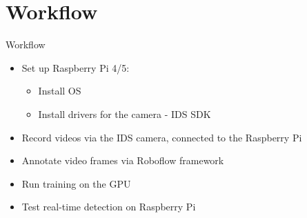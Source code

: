 \documentclass[aspectratio=169]{beamer}
\begin{document}
    \section{Workflow}
        \begin{frame}{Workflow}
            \begin{itemize}
                \item Set up Raspberry Pi 4/5:
                    \begin{itemize}
                        \item Install OS
                        \item Install drivers for the camera - IDS SDK
                    \end{itemize}
                \item Record videos via the IDS camera, connected to the Raspberry Pi
                \item Annotate video frames via Roboflow framework
                \item Run training on the GPU
                \item Test real-time detection on Raspberry Pi
            \end{itemize}
        \end{frame}
\end{document}

